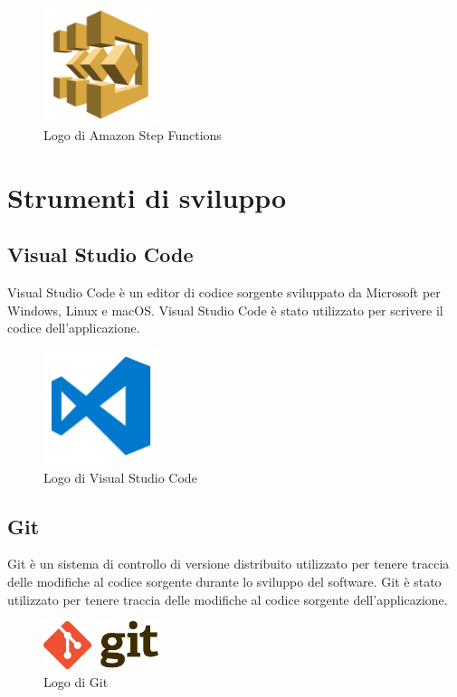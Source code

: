 \begin{figure}[h]
  \centering
  \includegraphics[width=0.3\textwidth]{img/tecnologie/stepfunctions.png}
  \caption{Logo di Amazon Step Functions}
  \label{fig:stepfunctions}
\end{figure}

\section{Strumenti di sviluppo}
\subsection{Visual Studio Code}
Visual Studio Code è un editor di codice sorgente sviluppato da Microsoft per Windows, Linux e macOS. Visual Studio Code è stato utilizzato per scrivere il codice dell'applicazione.

\begin{figure}[h]
  \centering
  \includegraphics[width=0.3\textwidth]{img/tecnologie/vscode.png}
  \caption{Logo di Visual Studio Code}
  \label{fig:vscode}
\end{figure}

\subsection{Git}
Git è un sistema di controllo di versione distribuito utilizzato per tenere traccia delle modifiche al codice sorgente durante lo sviluppo del software. Git è stato utilizzato per tenere traccia delle modifiche al codice sorgente dell'applicazione.

\begin{figure}[h]
  \centering
  \includegraphics[width=0.3\textwidth]{img/tecnologie/git.png}
  \caption{Logo di Git}
  \label{fig:git}
\end{figure}

